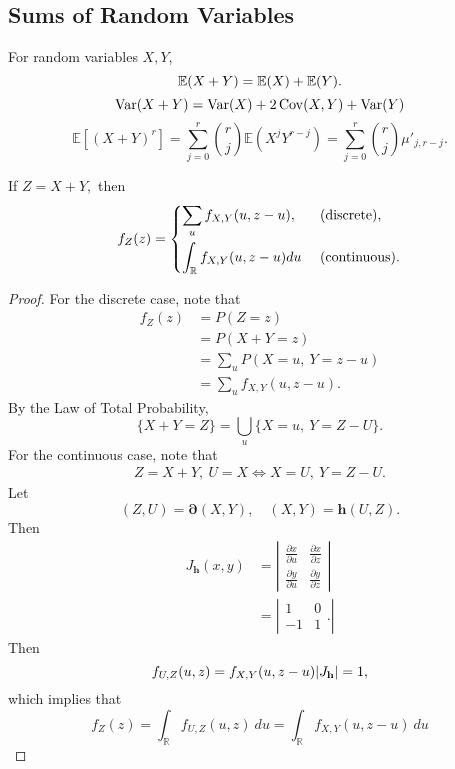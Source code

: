 
\subsection{Sums of Random Variables}
\begin{recall}
For random variables $X,Y$,
$$
\mathbb E(X+Y)=\mathbb E(X) +\mathbb E(Y).
$$
$$
\operatorname*{Var}(X+Y)=\operatorname*{Var}(X)+2\operatorname*{Cov}(X,Y)+\operatorname*{Var}(Y)
$$
$$
\mathbb E[(X+Y)^r]=\sum^r_{j=0}\binom{r}{j}\mathbb E(X^jY^{r-j})
=\sum^r_{j=0}\binom{r}{j}\mu'_{j,r-j}.
$$
\end{recall}

\begin{prop}
If $Z=X+Y,$ then
$$
f_Z(z)=\begin{dcases}\sum_u f_{X,Y}(u,z-u), \ &\text{ (discrete),} \\
\int_{\mathbb R}f_{X,Y}(u,z-u) du &\text{ (continuous).}
\end{dcases}
$$
\end{prop}

\begin{proof}
For the discrete case, note that
\begin{align*}
    f_Z(z)&=P(Z=z)\\&=P(X+Y=z)\\&=\sum_u P(X=u, \ Y=z-u)\\
    &=\sum_u f_{X,Y}(u,z-u).
\end{align*} 
By the Law of Total Probability, $$\{X+Y=Z\}=\bigcup_u\{X=u, \ Y=Z-U\}.$$
For the continuous case, note that
\begin{align*}
    Z=X+Y, \ U=X\iff X=U, \ Y=Z-U.
\end{align*}
Let
$$(Z,U)=\boldsymbol\partial(X,Y), \quad (X,Y)=\mathbf h (U,Z).
$$
Then
\begin{align*}
    J_{\mathbf h}(x,y)&=
    \left|
    \begin{array}{cc}
        \frac{\partial x}{\partial u} & \frac{\partial x}{\partial z} 
        \\
         \frac{\partial y}{\partial u} & \frac{\partial y}{\partial z} 
    \end{array}
    \right| \\
    &=
    \left|
    \begin{array}{cc}
        1 & 0 
        \\
        -1 & 1 
    \end{array}.
    \right| 
\end{align*}
Then
$$f_{U,Z}(u,z)=f_{X,Y}(u,z-u)|J_\mathbf h|=1,$$
which implies that
$$f_Z(z)=\int_{\mathbb R}f_{U,Z}(u,z)\ du=\int_{\mathbb R}f_{X,Y}(u,z-u)\ du$$
\end{proof}

